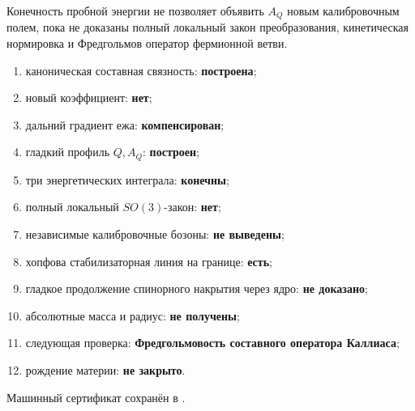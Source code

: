\begin{nogocriterion}
Конечность пробной энергии не позволяет объявить $A_Q$ новым калибровочным полем,
пока не доказаны полный локальный закон преобразования, кинетическая
нормировка и Фредгольмов оператор фермионной ветви.
\end{nogocriterion}

\begin{protocol}
\begin{enumerate}
 \item каноническая составная связность: \textbf{построена};
 \item новый коэффициент: \textbf{нет};
 \item дальний градиент ежа: \textbf{компенсирован};
 \item гладкий профиль $Q,A_Q$: \textbf{построен};
 \item три энергетических интеграла: \textbf{конечны};
 \item полный локальный $SO(3)$-закон: \textbf{нет};
 \item независимые калибровочные бозоны: \textbf{не выведены};
 \item хопфова стабилизаторная линия на границе: \textbf{есть};
 \item гладкое продолжение спинорного накрытия через ядро: \textbf{не доказано};
 \item абсолютные масса и радиус: \textbf{не получены};
 \item следующая проверка:
 \textbf{Фредгольмовость составного оператора Каллиаса};
 \item рождение материи: \textbf{не закрыто}.
\end{enumerate}
\end{protocol}

Машинный сертификат сохранён в
.